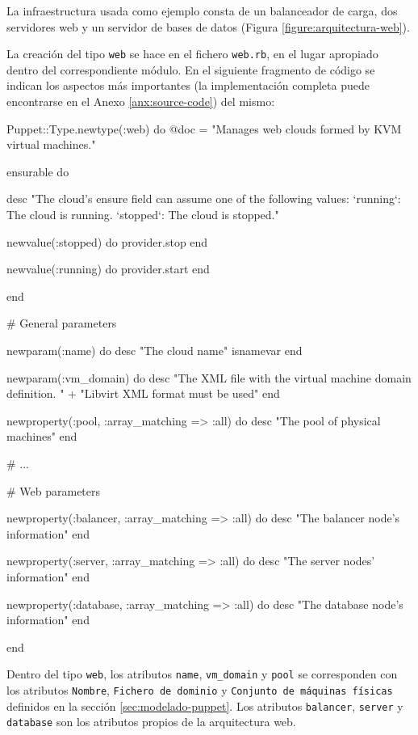 La infraestructura usada como ejemplo consta de un balanceador de carga, dos servidores web y un servidor de bases de datos (Figura \ref{figure:arquitectura-web}).


\pagebreak

La creación del tipo \texttt{web} se hace en el fichero \texttt{web.rb}, en el lugar apropiado dentro del correspondiente módulo. En el siguiente fragmento de código se indican los aspectos más importantes (la implementación completa puede encontrarse en el Anexo \ref{anx:source-code}) del mismo:

\begin{rubycode}
Puppet::Type.newtype(:web) do
   @doc = "Manages web clouds formed by KVM virtual machines."
   
   
   ensurable do

      desc "The cloud's ensure field can assume one of the following values:
   `running`: The cloud is running.
   `stopped`: The cloud is stopped.\n"
   
      newvalue(:stopped) do
         provider.stop
      end

      newvalue(:running) do
         provider.start
      end

   end


   # General parameters
   
   newparam(:name) do
      desc "The cloud name"
      isnamevar
   end
   
   newparam(:vm_domain) do
      desc "The XML file with the virtual machine domain definition. " +
           "Libvirt XML format must be used"
   end
   
   newproperty(:pool, :array_matching => :all) do
      desc "The pool of physical machines"
   end

   # ...


   # Web parameters
   
   newproperty(:balancer, :array_matching => :all) do
      desc "The balancer node's information"
   end
   
   newproperty(:server, :array_matching => :all) do
      desc "The server nodes' information"
   end
   
   newproperty(:database, :array_matching => :all) do
      desc "The database node's information"
   end

end

\end{rubycode}

Dentro del tipo \texttt{web}, los atributos \texttt{name}, \texttt{vm\_domain} y \texttt{pool} se corresponden con los atributos \texttt{Nombre}, \texttt{Fichero de dominio} y \texttt{Conjunto de máquinas físicas} definidos en la sección \ref{sec:modelado-puppet}. Los atributos \texttt{balancer}, \texttt{server} y \texttt{database} son los atributos propios de la arquitectura web.

